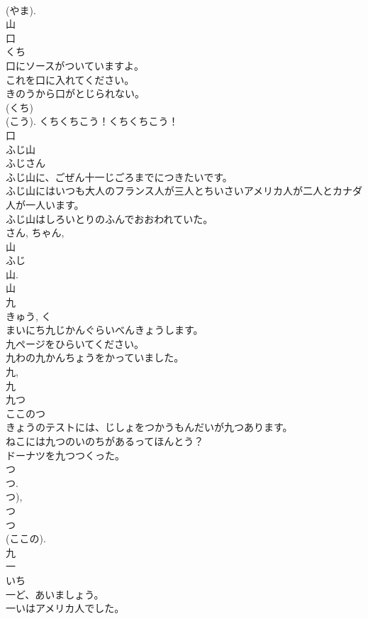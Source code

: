 \documentclass[8pt]{extreport}
\begin{document}
\begin{CJK}{UTF8}{min}
\\	(やま). 
\\	山	
\\	口	
\\	くち	
\\	口にソースがついていますよ。	
\\	これを口に入れてください。	
\\	きのうから口がとじられない。	
\\	(くち) 
\\	(こう). くちくちこう！くちくちこう！ 
\\	口	
\\	ふじ山	
\\	ふじさん	
\\	ふじ山に、ごぜん十一じごろまでにつきたいです。	
\\	ふじ山にはいつも大人のフランス人が三人とちいさいアメリカ人が二人とカナダ人が一人います。	
\\	ふじ山はしろいとりのふんでおおわれていた。	
\\	さん, ちゃん, 
\\	山 
\\	ふじ 
\\	山. 
\\	山	
\\	九	
\\	きゅう, く	
\\	まいにち九じかんぐらいべんきょうします。	
\\	九ページをひらいてください。	
\\	九わの九かんちょうをかっていました。	
\\	九, 
\\	九	
\\	九つ	
\\	ここのつ	
\\	きょうのテストには、じしょをつかうもんだいが九つあります。	
\\	ねこには九つのいのちがあるってほんとう？	
\\	ドーナツを九つつくった。	
\\	つ 
\\	つ. 
\\	つ), 
\\	つ 
\\	つ 
\\	(ここの). 
\\	九	
\\	一	
\\	いち	
\\	一ど、あいましょう。	
\\	一いはアメリカ人でした。	

\end{CJK}
\end{document}
